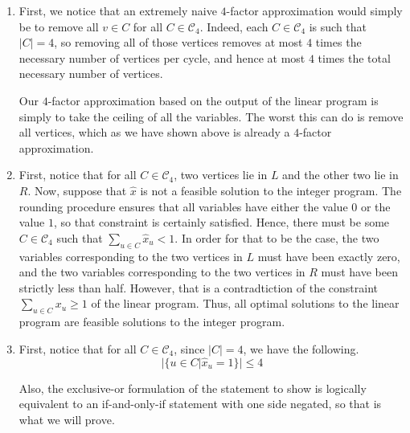 \documentclass[letterpaper,11pt]{article}
\begin{document}
\begin{enumerate}
\begin{enumerate}
            \item
                First, we notice that an extremely naive $4$-factor
                approximation would simply be to remove all $v \in C$ for all
                $C \in \mathcal{C}_4$. Indeed, each $C \in \mathcal{C}_4$ is
                such that $|C| = 4$, so removing all of those vertices removes
                at most $4$ times the necessary number of vertices per cycle,
                and hence at most $4$ times the total necessary number of
                vertices.

                Our $4$-factor approximation based on the output of the linear
                program is simply to take the ceiling of all the variables. The
                worst this can do is remove all vertices, which as we have
                shown above is already a $4$-factor approximation.

            \item
                First, notice that for all $C \in \mathcal{C}_4$, two vertices
                lie in $L$ and the other two lie in $R$.
                Now, suppose that $\hat x$ is not a feasible solution to the
                integer program. The rounding procedure ensures that all
                variables have either the value $0$ or the value $1$, so that
                constraint is certainly satisfied. Hence, there must be some
                $C \in \mathcal{C}_4$ such that $\sum_{u \in C} \hat x_u < 1$.
                In order for that to be the case, the two variables
                corresponding to the two vertices in $L$ must have been exactly
                zero, and the two variables corresponding to the two vertices
                in $R$ must have been strictly less than half. However, that is
                a contradtiction of the constraint $\sum_{u \in C} x_u \geq 1$
                of the linear program. Thus, all optimal solutions to the
                linear program are feasible solutions to the integer program.

            \item
                First, notice that for all $C \in \mathcal{C}_4$, since
                $|C| = 4$, we have the following.
                $$
                |\{u \in C | \hat x_u = 1\}| \leq 4
                $$

                Also, the exclusive-or formulation of the statement to show is
                logically equivalent to an if-and-only-if statement with one
                side negated, so that is what we will prove.


\end{enumerate}
\end{enumerate}
\end{document}
